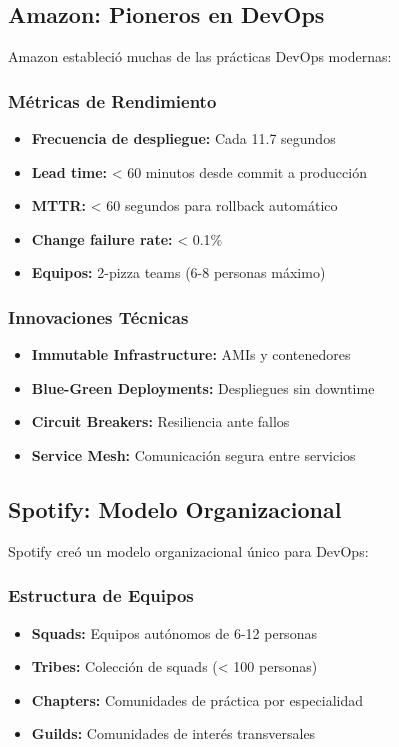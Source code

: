 \documentclass[12pt,a4paper]{article}
\begin{document}
\subsection{Amazon: Pioneros en DevOps}
Amazon estableció muchas de las prácticas DevOps modernas:

\subsubsection{Métricas de Rendimiento}
\begin{itemize}
    \item \textbf{Frecuencia de despliegue:} Cada 11.7 segundos
    \item \textbf{Lead time:} < 60 minutos desde commit a producción
    \item \textbf{MTTR:} < 60 segundos para rollback automático
    \item \textbf{Change failure rate:} < 0.1\%
    \item \textbf{Equipos:} 2-pizza teams (6-8 personas máximo)
\end{itemize}

\subsubsection{Innovaciones Técnicas}
\begin{itemize}
    \item \textbf{Immutable Infrastructure:} AMIs y contenedores
    \item \textbf{Blue-Green Deployments:} Despliegues sin downtime
    \item \textbf{Circuit Breakers:} Resiliencia ante fallos
    \item \textbf{Service Mesh:} Comunicación segura entre servicios
\end{itemize}

\subsection{Spotify: Modelo Organizacional}
Spotify creó un modelo organizacional único para DevOps:

\subsubsection{Estructura de Equipos}
\begin{itemize}
    \item \textbf{Squads:} Equipos autónomos de 6-12 personas
    \item \textbf{Tribes:} Colección de squads (< 100 personas)
    \item \textbf{Chapters:} Comunidades de práctica por especialidad
    \item \textbf{Guilds:} Comunidades de interés transversales
\end{itemize}
\end{document}
